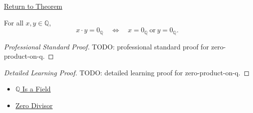 \newpage
{}
\label{prf:zero-product-on-q}

\begin{remark*}[Return]
\hyperref[cor:zero-product-on-q]{Return to Theorem}
\end{remark*}

\begin{corollary*}
For all $x,y\in\mathbb{Q}$,
\[
x\cdot y=0_{\mathbb{Q}}
\quad\Longleftrightarrow\quad
x=0_{\mathbb{Q}}\ \text{or}\ y=0_{\mathbb{Q}}.
\]
\end{corollary*}

\begin{proof}[Professional Standard Proof]
\LRAProofBodyStart
TODO: professional standard proof for zero-product-on-q.
\end{proof}

\begin{proof}[Detailed Learning Proof]
\LRAProofBodyStart
TODO: detailed learning proof for zero-product-on-q.
\end{proof}

\begin{remark*}
\end{remark*}

\begin{dependencies}
\begin{itemize}
  \item \hyperref[thm:q-is-a-field]{$\mathbb{Q}$ Is a Field}
  \item \hyperref[def:zero-divisor]{Zero Divisor}
\end{itemize}
\end{dependencies}

\clearpage
